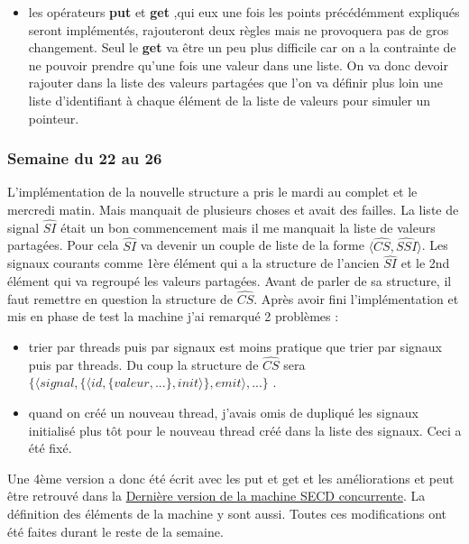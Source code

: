 \documentclass[10pt,a4paper]{article}
\begin{document}
\begin{itemize}
				 \item les opérateurs \textbf{put} et \textbf{get} ,qui eux une fois les points précédémment expliqués seront implémentés, rajouteront deux règles mais ne provoquera pas de gros changement.
				 \smallbreak 
				 Seul le \textbf{get} va être un peu plus difficile car on a la contrainte de ne pouvoir prendre qu'une fois une valeur dans une liste. On va donc devoir rajouter dans la liste des valeurs partagées que l'on va définir plus loin une liste d'identifiant à chaque élément de la liste de valeurs pour simuler un pointeur.
			\end{itemize}
			\bigbreak
			
			
		\subsubsection{Semaine du 22 au 26}
			
			L'implémentation de la nouvelle structure a pris le mardi au complet et le mercredi matin. Mais manquait de plusieurs choses et avait des failles. 
			\smallbreak
			La liste de signal $\widehat{SI}$ était un bon commencement mais il me manquait la liste de valeurs partagées. Pour cela $\widehat{SI}$ va devenir un couple de liste de la forme $\langle\widehat{CS},\widehat{SSI}\rangle$. Les signaux courants comme 1ère élément qui a la structure de l'ancien $\widehat{SI}$ et le 2nd élément qui va regroupé les valeurs partagées. Avant de parler de sa structure, il faut remettre en question la structure de $\widehat{CS}$. 
			\smallbreak
			Après avoir fini l'implémentation et mis en phase de test la machine j'ai remarqué 2 problèmes : 
				\begin{itemize}
					\item trier par threads puis par signaux est moins pratique que trier par signaux puis par threads. Du coup la structure de $\widehat{CS}$ sera $\{ \langle signal , \{\langle id , \{valeur,...\},init\rangle\},emit\rangle,...\}$ .
					\item quand on créé un nouveau thread, j'avais omis de dupliqué les signaux initialisé plus tôt pour le nouveau thread créé dans la liste des signaux. Ceci a été fixé. 
				\end{itemize} 
			\bigbreak
			
			
			Une 4ème version a donc été écrit avec les put et get et les améliorations et peut être retrouvé dans la \hyperref[SECDConc4]{Dernière version de la machine SECD concurrente}. La définition des éléments de la machine y sont aussi. Toutes ces modifications ont été faites durant le reste de la semaine.
		\newpage
\end{document}
